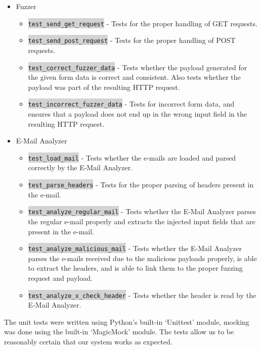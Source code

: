 \begin{itemize}
	\item Fuzzer
	\begin{itemize}
		\item \colorbox{lightgray}{\lstinline{test_send_get_request}} - Tests for the proper handling of GET requests.
		\item \colorbox{lightgray}{\lstinline{test_send_post_request}} - Tests for the proper handling of POST requests.
		\item \colorbox{lightgray}{\lstinline{test_correct_fuzzer_data}} - Tests whether the payload generated for the given form data is correct and consistent. Also tests whether the payload was part of the resulting HTTP request.
		\item \colorbox{lightgray}{\lstinline{test_incorrect_fuzzer_data}} - Tests for incorrect form data, and ensures that a payload does not end up in the wrong input field in the resulting HTTP request.
	\end{itemize}
	\item E-Mail Analyzer
	\begin{itemize}
		\item \colorbox{lightgray}{\lstinline{test_load_mail}} - Tests whether the e-mails are loaded and parsed correctly by the E-Mail Analyzer.
		\item \colorbox{lightgray}{\lstinline{test_parse_headers}} - Tests for the proper parsing of headers present in the e-mail.
		\item \colorbox{lightgray}{\lstinline{test_analyze_regular_mail}} - Tests whether the E-Mail Analyzer parses the regular e-mail properly and extracts the injected input fields that are present in the e-mail.
		\item \colorbox{lightgray}{\lstinline{test_analyze_malicious_mail}} - Tests whether the E-Mail Analyzer parses the e-mails received due to the malicious payloads properly, is able to extract the  headers, and is able to link them to the proper fuzzing request and payload.
		\item \colorbox{lightgray}{\lstinline{test_analyze_x_check_header}} - Tests whether the  header is read by the E-Mail Analyzer.
	\end{itemize}
\end{itemize}
The unit tests were written using Python's built-in `Unittest' module, mocking was done using the built-in `MagicMock' module. The tests allow us to be reasonably certain that our system works as expected.
